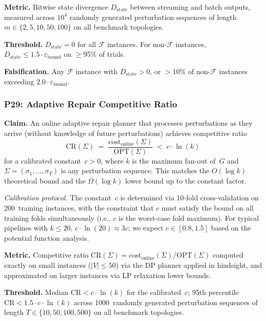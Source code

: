 \documentclass[11pt,a4paper]{article}
\theoremstyle{definition}
\newcommand{\cost}{\mathrm{cost}}
\newcommand{\OPT}{\mathrm{OPT}}
\newcommand{\FragF}{\mathcal{F}}
\newcommand{\ebound}{\varepsilon_{\mathrm{bound}}}
\begin{document}
\textbf{Metric.}  Bitwise state divergence $D_{\mathrm{state}}$ between
streaming and batch outputs, measured across $10^4$ randomly generated
perturbation sequences of length $m \in \{2, 5, 10, 50, 100\}$ on all
benchmark topologies.

\textbf{Threshold.}  $D_{\mathrm{state}} = 0$ for all $\FragF$ instances.
For non-$\FragF$ instances, $D_{\mathrm{state}} \leq 1.5 \cdot \ebound$ on
$\geq$95\% of trials.

\textbf{Falsification.}  Any $\FragF$ instance with $D_{\mathrm{state}} > 0$,
or $>$10\% of non-$\FragF$ instances exceeding $2.0 \cdot \ebound$.

\subsubsection{P29: Adaptive Repair Competitive Ratio}
\label{sec:p29}

\textbf{Claim.}
An online adaptive repair planner that processes perturbations as they arrive
(without knowledge of future perturbations) achieves competitive ratio
\[
  \mathrm{CR}(\Sigma)
  \;=\;
  \frac{\cost_{\mathrm{online}}(\Sigma)}{\OPT(\Sigma)}
  \;<\;
  c \cdot \ln(k)
\]
for a calibrated constant~$c > 0$, where $k$ is the maximum fan-out of~$G$
and $\Sigma = (\sigma_1, \ldots, \sigma_T)$ is any perturbation sequence.
This matches the $O(\log k)$ theoretical bound and the $\Omega(\log k)$
lower bound up to the constant factor.

\emph{Calibration protocol.}  The constant~$c$ is determined via
10-fold cross-validation on 200~training instances, with the constraint that
$c$ must satisfy the bound on all training folds simultaneously (i.e., $c$
is the worst-case fold maximum).  For typical pipelines with
$k \leq 20$, $c \cdot \ln(20) \approx 3c$; we expect $c \in [0.8, 1.5]$
based on the potential function analysis.

\textbf{Metric.}  Competitive ratio
$\mathrm{CR}(\Sigma) = \cost_{\mathrm{online}}(\Sigma) / \OPT(\Sigma)$
computed exactly on small instances ($|V| \leq 50$) via the DP planner
applied in hindsight, and approximated on larger instances via LP relaxation
lower bounds.

\textbf{Threshold.}  Median $\mathrm{CR} < c \cdot \ln(k)$ for the
calibrated~$c$; 95th percentile
$\mathrm{CR} < 1.5 \cdot c \cdot \ln(k)$ across 1000~randomly generated
perturbation sequences of length $T \in \{10, 50, 100, 500\}$ on all
benchmark topologies.
\end{document}
